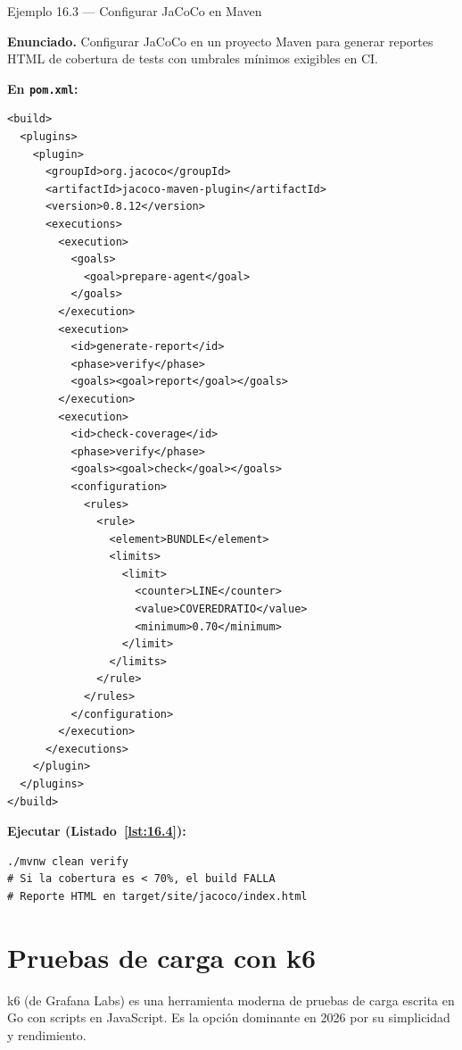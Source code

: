 \documentclass[11pt,a4paper,openany]{book}
\begin{document}
\begin{cajaejemplo}{Ejemplo 16.3 --- Configurar JaCoCo en Maven}

\textbf{Enunciado.} Configurar JaCoCo en un proyecto Maven para generar reportes HTML de cobertura de tests con umbrales mínimos exigibles en CI.

\textbf{En \texttt{pom.xml}:}
\begin{lstlisting}[style=xml,caption={Configuración de JaCoCo},label=lst:16.3]
<build>
  <plugins>
    <plugin>
      <groupId>org.jacoco</groupId>
      <artifactId>jacoco-maven-plugin</artifactId>
      <version>0.8.12</version>
      <executions>
        <execution>
          <goals>
            <goal>prepare-agent</goal>
          </goals>
        </execution>
        <execution>
          <id>generate-report</id>
          <phase>verify</phase>
          <goals><goal>report</goal></goals>
        </execution>
        <execution>
          <id>check-coverage</id>
          <phase>verify</phase>
          <goals><goal>check</goal></goals>
          <configuration>
            <rules>
              <rule>
                <element>BUNDLE</element>
                <limits>
                  <limit>
                    <counter>LINE</counter>
                    <value>COVEREDRATIO</value>
                    <minimum>0.70</minimum>
                  </limit>
                </limits>
              </rule>
            </rules>
          </configuration>
        </execution>
      </executions>
    </plugin>
  </plugins>
</build>
\end{lstlisting}

\textbf{Ejecutar (Listado~\ref{lst:16.4}):}
\begin{lstlisting}[style=shell,numbers=none,caption={Ejemplo de Shell},label=lst:16.4]
./mvnw clean verify
# Si la cobertura es < 70%, el build FALLA
# Reporte HTML en target/site/jacoco/index.html
\end{lstlisting}
\end{cajaejemplo}

\section{Pruebas de carga con k6}

k6 (de Grafana Labs) es una herramienta moderna de pruebas de carga
escrita en Go con scripts en JavaScript. Es la opción dominante en
2026 por su simplicidad y rendimiento.
\end{document}
